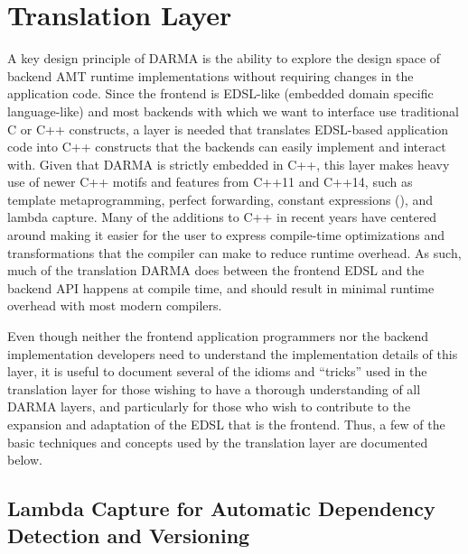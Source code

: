 
\chapter{Translation Layer}
\label{chap:translation_layer}

A key design principle of DARMA is the ability to explore the design space of
backend AMT runtime implementations without requiring changes in the application
code.  Since the frontend is EDSL-like (embedded domain specific language-like)
and most backends with which we want to interface use traditional C or C++
constructs, a layer is needed that translates EDSL-based application code into
C++ constructs that the backends can easily implement and interact with.  Given
that DARMA is strictly embedded in C++, this layer makes heavy use of newer C++
motifs and features from C++11 and C++14, such as template metaprogramming,
perfect forwarding, constant expressions (), and lambda
capture.  Many of the additions to C++ in recent years have centered around
making it easier for the user to express compile-time optimizations and
transformations that the compiler can make to reduce runtime overhead.  As such,
much of the translation DARMA does between the frontend EDSL and the backend API
happens at compile time, and should result in minimal runtime overhead with most
modern compilers.

Even though neither the frontend application programmers nor the backend
implementation developers need to understand the implementation details of this
layer, it is useful to document several of the idioms and ``tricks'' used in the
translation layer for those wishing to have a thorough understanding of all
DARMA layers, and particularly for those who wish to contribute to the expansion
and adaptation of the EDSL that is the frontend.  Thus, a few of the basic
techniques and concepts used by the translation layer are documented below.

\section{Lambda Capture for Automatic Dependency Detection and Versioning}

